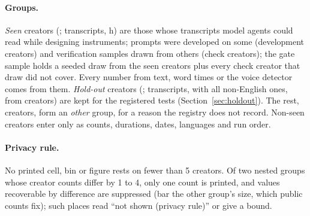 \medskip
\noindent{}
\medskip

\paragraph{Groups.} \textit{Seen} creators (\NSeen{}; \NSeenFiles{} transcripts, \SeenHours{} h) are those whose
transcripts model agents could read while designing instruments; prompts were developed on some
(development creators) and verification samples drawn from others (check creators); the gate sample holds a seeded
draw from the seen creators plus every check creator that draw did not cover. Every number from text,
word times or the voice detector comes from them. \textit{Hold-out} creators (\NHoldout{}; \NHoldoutFiles{}
transcripts, with all \NNonEnglishFiles{} non-English ones, from \NNonEnglishCreators{} creators) are kept for the
registered tests (Section~\ref{sec:holdout}). The rest, \NOtherCreators{} creators, form an \textit{other} group, for
a reason the registry does not record. Non-seen creators enter only as counts, durations, dates, languages and run
order.

\paragraph{Privacy rule.} No printed cell, bin or figure rests on fewer than 5 creators. Of two nested groups whose
creator counts differ by 1 to 4, only one count is printed, and values recoverable by difference are suppressed (bar
the other group's size, which public counts fix); such places read ``not shown (privacy rule)'' or give a bound.
